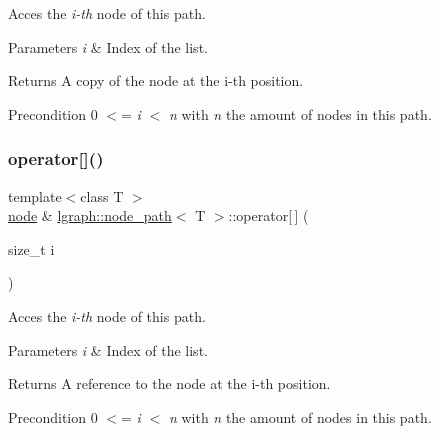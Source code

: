 Acces the {\itshape i-\/th} node of this path. 


\begin{DoxyParams}{Parameters}
{\em i} & Index of the list. \\
\hline
\end{DoxyParams}
\begin{DoxyReturn}{Returns}
A copy of the node at the i-\/th position. 
\end{DoxyReturn}
\begin{DoxyPrecond}{Precondition}
0 $<$= {\itshape i} $<$ {\itshape n} with {\itshape n} the amount of nodes in this path. 
\end{DoxyPrecond}
\mbox{\label{classlgraph_1_1node__path_ad7cf4262b891ee24938fb0b91ac3cfd8}} 
\subsubsection{\texorpdfstring{operator[]()}{operator[]()}\hspace{0.1cm}{\footnotesize\ttfamily [2/2]}}
{\footnotesize\ttfamily template$<$class T $>$ \\
\hyperlink{namespacelgraph_a397169dd66adf725210a30fb7251773e}{node} \& \hyperlink{classlgraph_1_1node__path}{lgraph\+::node\+\_\+path}$<$ T $>$\+::operator\mbox{[}$\,$\mbox{]} (\begin{DoxyParamCaption}\item[{size\+\_\+t}]{i }\end{DoxyParamCaption})}



Acces the {\itshape i-\/th} node of this path. 


\begin{DoxyParams}{Parameters}
{\em i} & Index of the list. \\
\hline
\end{DoxyParams}
\begin{DoxyReturn}{Returns}
A reference to the node at the i-\/th position. 
\end{DoxyReturn}
\begin{DoxyPrecond}{Precondition}
0 $<$= {\itshape i} $<$ {\itshape n} with {\itshape n} the amount of nodes in this path. 
\end{DoxyPrecond}
\mbox{\label{classlgraph_1_1node__path_a3fc92cd79059820c0206435d8546b90c}} 
